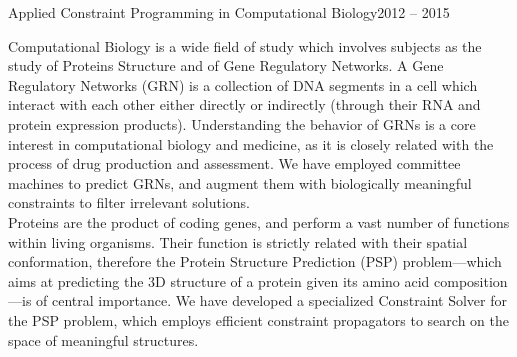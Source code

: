 \vspace{-20pt}
\begin{rSubsection}{Applied Constraint Programming in Computational Biology}{2012 -- 2015}{}{}
\item[]
\begin{figwindownonum}
Computational Biology is a wide field of study which involves subjects as the study of Proteins Structure and of Gene Regulatory Networks. A Gene Regulatory Networks (GRN) is a collection of DNA segments in a cell which interact with each other either directly or indirectly (through their RNA and protein expression products). Understanding the behavior of GRNs is a core interest in computational biology and medicine, as it is closely related with the process of drug production and assessment. We have employed committee machines to predict GRNs, and augment them with biologically meaningful constraints to filter irrelevant solutions. \\
Proteins are the product of coding genes, and perform a vast number of functions within living organisms. Their function is strictly related with their spatial conformation, therefore the Protein Structure Prediction (PSP) problem---which aims at predicting the 3D structure of a protein given its amino acid composition---is of central importance. 
We have developed a specialized Constraint Solver for the PSP problem, which employs efficient constraint propagators to search on the space of meaningful structures.
\end{figwindownonum}
\end{rSubsection}
\vspace{-20pt}
